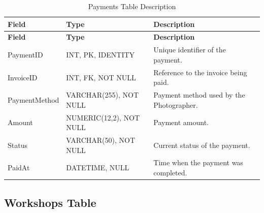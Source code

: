 \begin{longtable}{
		|>{\raggedright\arraybackslash}p{3.2cm}|
		>{\raggedright\arraybackslash}p{4.2cm}|
		>{\raggedright\arraybackslash}p{5.0cm}|
	}
	\caption{Payments Table Description}
	\label{tab:payments}\\
	\hline
	\textbf{Field} & \textbf{Type} & \textbf{Description} \\ \hline
	\endfirsthead
	\hline
	\textbf{Field} & \textbf{Type} & \textbf{Description} \\ \hline
	\endhead
	
	PaymentID & INT, PK, IDENTITY &
	Unique identifier of the payment. \\ \hline
	
	InvoiceID & INT, FK, NOT NULL &
	Reference to the invoice being paid. \\ \hline
	
	PaymentMethod & VARCHAR(255), NOT NULL &
	Payment method used by the Photographer. \\ \hline
	
	Amount & NUMERIC(12,2), NOT NULL &
	Payment amount. \\ \hline
	
	Status & VARCHAR(50), NOT NULL &
	Current status of the payment. \\ \hline
	
	PaidAt & DATETIME, NULL &
	Time when the payment was completed. \\ \hline
	
\end{longtable}


\subsection{Workshops Table}

